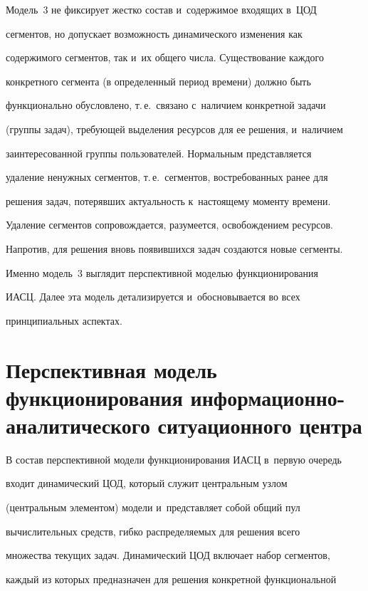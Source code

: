 Модель~3 не фиксирует жестко состав и~содержимое входящих в~ЦОД 


сегментов, но допускает возможность динамического изменения как 


содержимого сегментов, так и~их общего числа. Существование каждого 


конкретного сегмента (в определенный период времени) должно быть 


функционально обусловлено, т.\,е.\ связано с~наличием конкретной задачи 


(группы задач), требующей выделения ресурсов для ее решения, и~наличием 


заинтересованной группы пользователей. Нормальным представляется 


удаление ненужных сегментов, т.\,е.\ сегментов, востребованных ранее для 


решения задач, потерявших актуальность к~настоящему моменту времени. 


Удаление сегментов сопровождается, разумеется, освобождением ресурсов. 


Напротив, для решения вновь появившихся задач создаются новые сегменты.





Именно модель~3 выглядит перспективной моделью функционирования 


ИАСЦ. Далее эта модель детализируется и~обосновывается во всех 


принципиальных аспектах.





\section{Перспективная модель функционирования информационно-аналитического ситуационного центра}





В состав перспективной модели функционирования ИАСЦ в~первую очередь 


входит динамический ЦОД, который служит центральным узлом 


(центральным элементом) модели и~представляет собой общий пул 


вычислительных средств, гибко распределяемых для решения всего 


множества текущих задач. Динамический ЦОД включает набор сегментов, 


каждый из которых предназначен для решения конкретной функциональной 


